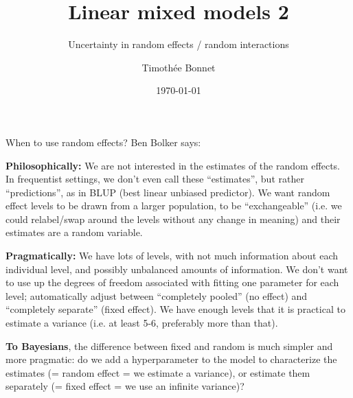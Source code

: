 \documentclass{beamer}
\title{Linear mixed models 2}
\subtitle{Uncertainty in random effects / random interactions}
\author{Timoth\'ee Bonnet}
\date{\today}
\begin{document}


\begin{frame}{When to use random effects? Ben Bolker says:}

 \textbf{ Philosophically:}
    \small
We are not interested in the estimates of the random effects. In frequentist settings, we don’t even call these “estimates”, but rather
“predictions”, as in BLUP (best linear unbiased predictor). We want random effect levels to be drawn from a larger population, to be “exchangeable” (i.e. we could relabel/swap around the levels
without any change in meaning) and their estimates are a random variable.

\textbf{Pragmatically:}
We have lots of levels, with not much information about each individual
level, and possibly unbalanced amounts of information. We don’t want to use up the degrees of freedom associated with fitting one
parameter for each level; automatically adjust between “completely pooled” (no effect) and “completely separate” (fixed effect). We have enough levels that it is practical to estimate a variance (i.e. at
least 5-6, preferably more than that).

\textbf{To Bayesians}, the difference between fixed and random is much simpler and more pragmatic: do we add a hyperparameter to the model to characterize the estimates (= random effect = we estimate a variance), or estimate them separately (= fixed effect = we use an infinite variance)?

 
\end{frame}


\begin{frame}{}
\maketitle

\end{frame}
\end{document}
